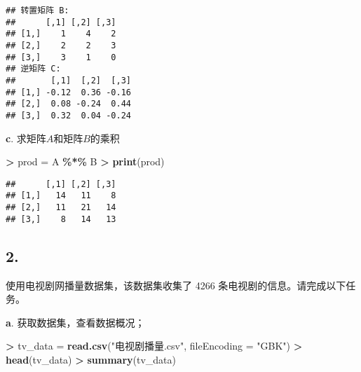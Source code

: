 \documentclass[
]{article}
\newenvironment{Shaded}{\begin{snugshade}}{\end{snugshade}}
\newcommand{\AttributeTok}[1]{\textcolor[rgb]{0.13,0.29,0.53}{#1}}
\newcommand{\FunctionTok}[1]{\textcolor[rgb]{0.13,0.29,0.53}{\textbf{#1}}}
\newcommand{\NormalTok}[1]{#1}
\newcommand{\OtherTok}[1]{\textcolor[rgb]{0.56,0.35,0.01}{#1}}
\newcommand{\SpecialCharTok}[1]{\textcolor[rgb]{0.81,0.36,0.00}{\textbf{#1}}}
\newcommand{\StringTok}[1]{\textcolor[rgb]{0.31,0.60,0.02}{#1}}
\begin{document}
\begin{verbatim}
## 转置矩阵 B:
##      [,1] [,2] [,3]
## [1,]    1    4    2
## [2,]    2    2    3
## [3,]    3    1    0
## 逆矩阵 C:
##       [,1]  [,2]  [,3]
## [1,] -0.12  0.36 -0.16
## [2,]  0.08 -0.24  0.44
## [3,]  0.32  0.04 -0.24
\end{verbatim}

\textbf{c}. 求矩阵\(A\)和矩阵\(B\)的乘积

\begin{Shaded}
\begin{Highlighting}[]
\SpecialCharTok{\textgreater{}}\NormalTok{ prod }\OtherTok{=}\NormalTok{ A }\SpecialCharTok{\%*\%}\NormalTok{ B}
\SpecialCharTok{\textgreater{}} \FunctionTok{print}\NormalTok{(prod)}
\end{Highlighting}
\end{Shaded}

\begin{verbatim}
##      [,1] [,2] [,3]
## [1,]   14   11    8
## [2,]   11   21   14
## [3,]    8   14   13
\end{verbatim}

\subsection{2.}\label{section-1}

使用电视剧网播量数据集，该数据集收集了 4266
条电视剧的信息。请完成以下任务。

\textbf{a}. 获取数据集，查看数据概况；

\begin{Shaded}
\begin{Highlighting}[]
\SpecialCharTok{\textgreater{}}\NormalTok{ tv\_data }\OtherTok{=} \FunctionTok{read.csv}\NormalTok{(}\StringTok{"电视剧播量.csv"}\NormalTok{, }\AttributeTok{fileEncoding =} \StringTok{"GBK"}\NormalTok{)}
\SpecialCharTok{\textgreater{}} \FunctionTok{head}\NormalTok{(tv\_data)}
\SpecialCharTok{\textgreater{}} \FunctionTok{summary}\NormalTok{(tv\_data)}
\end{Highlighting}
\end{Shaded}
\end{document}
